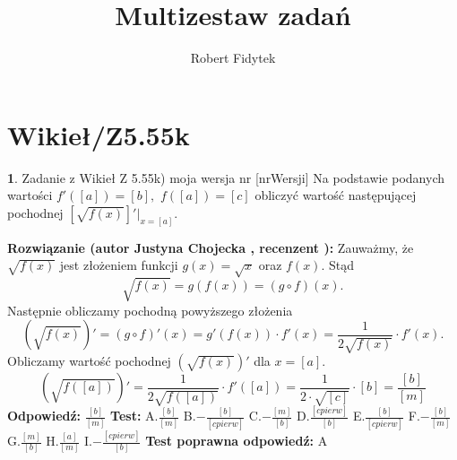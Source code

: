 \documentclass[12pt, a4paper]{article}
\title{Multizestaw zadań}
\author{Robert Fidytek}
\date{}
\theoremstyle{definition} %
\newtheorem{zad}{}
\newcommand{\kategoria}[1]{\section{#1}} %
\newcommand{\zadStart}[1]{\begin{zad}#1\newline} %
\newcommand{\zadStop}{\end{zad}}   %
\newcommand{\rozwStart}[2]{\noindent \textbf{Rozwiązanie (autor #1 , recenzent #2): }\newline} %
\newcommand{\rozwStop}{\newline}                                            %
\newcommand{\odpStart}{\noindent \textbf{Odpowiedź:}\newline}    %
\newcommand{\odpStop}{\newline}                                             %
\newcommand{\testStart}{\noindent \textbf{Test:}\newline} %
\newcommand{\testStop}{\newline} %
\newcommand{\kluczStart}{\noindent \textbf{Test poprawna odpowiedź:}\newline} %
\newcommand{\kluczStop}{\newline} %
\begin{document}
\maketitle


\kategoria{Wikieł/Z5.55k}
\zadStart{Zadanie z Wikieł Z 5.55k) moja wersja nr [nrWersji]}
Na podstawie podanych wartości $f'([a])=[b],$ $f([a])=[c]$ obliczyć wartość następującej pochodnej $\left[\sqrt{f(x)}\right]' \big |_{x=[a]}$.
\zadStop
\rozwStart{Justyna Chojecka}{}
Zauważmy, że $\sqrt{f(x)}$ jest złożeniem funkcji $g(x)=\sqrt{x}$ oraz $f(x)$. Stąd 
$$\sqrt{f(x)}=g(f(x))=(g\circ f)(x).$$
Następnie obliczamy pochodną powyższego złożenia
$$\left(\sqrt{f(x)}\right)'=(g\circ f)'(x)=g'(f(x))\cdot f'(x)=\frac{1}{2\sqrt{f(x)}}\cdot f'(x).$$
Obliczamy wartość pochodnej $\left(\sqrt{f(x)}\right)'$ dla $x=[a]$.
$$\left(\sqrt{f([a])}\right)'=\frac{1}{2\sqrt{f([a])}}\cdot f'([a])=\frac{1}{2\cdot \sqrt{[c]}}\cdot [b]=\frac{[b]}{[m]}$$
\rozwStop
\odpStart
$\frac{[b]}{[m]}$
\odpStop
\testStart
A.$\frac{[b]}{[m]}$
B.$-\frac{[b]}{[cpierw]}$
C.$-\frac{[m]}{[b]}$
D.$\frac{[cpierw]}{[b]}$
E.$\frac{[b]}{[cpierw]}$
F.$-\frac{[b]}{[m]}$
G.$\frac{[m]}{[b]}$
H.$\frac{[a]}{[m]}$
I.$-\frac{[cpierw]}{[b]}$
\testStop
\kluczStart
A
\kluczStop
\end{document}
